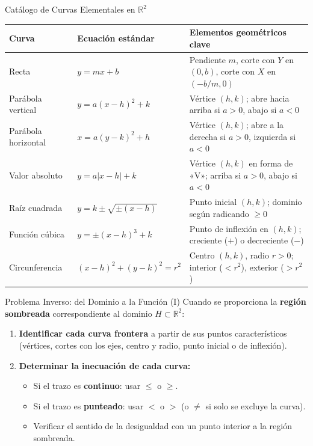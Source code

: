 \documentclass[aspectratio=169,10pt]{beamer}
\begin{document}
\begin{frame}{Catálogo de Curvas Elementales en $\mathbb{R}^2$}
  \begin{table}
    \centering
    \setlength{\tabcolsep}{3pt}
    \renewcommand{\arraystretch}{1.08}
    \footnotesize
    \begin{tabular}{p{3.0cm} p{3.8cm} p{6.2cm}}
      \toprule
      \textbf{Curva} & \textbf{Ecuación estándar} & \textbf{Elementos geométricos clave} \\
      \midrule
      Recta & $y = mx + b$ & Pendiente $m$, corte con $Y$ en $(0,b)$, corte con $X$ en $(-b/m, 0)$ \\
      Parábola vertical & $y = a(x-h)^2 + k$ & Vértice $(h,k)$; abre hacia arriba si $a>0$, abajo si $a<0$ \\
      Parábola horizontal & $x = a(y-k)^2 + h$ & Vértice $(h,k)$; abre a la derecha si $a>0$, izquierda si $a<0$ \\
      Valor absoluto & $y = a|x-h| + k$ & Vértice $(h,k)$ en forma de «V»; arriba si $a>0$, abajo si $a<0$ \\
      Raíz cuadrada & $y = k \pm \sqrt{\pm(x-h)}$ & Punto inicial $(h,k)$; dominio según radicando $\ge 0$ \\
      Función cúbica & $y = \pm(x-h)^3 + k$ & Punto de inflexión en $(h,k)$; creciente ($+$) o decreciente ($-$) \\
      Circunferencia & $(x-h)^2 + (y-k)^2 = r^2$ & Centro $(h,k)$, radio $r>0$; interior ($<r^2$), exterior ($>r^2$) \\
      \bottomrule
    \end{tabular}
  \end{table}
  \vfill
\end{frame}

\begin{frame}{Problema Inverso: del Dominio a la Función (I)}
  Cuando se proporciona la \textbf{región sombreada} correspondiente al dominio $H \subset \mathbb{R}^2$:

  \begin{enumerate}
    \item \textbf{Identificar cada curva frontera} a partir de sus puntos característicos
      (vértices, cortes con los ejes, centro y radio, punto inicial o de inflexión).
    \item \textbf{Determinar la inecuación de cada curva:}
      \begin{itemize}
        \item Si el trazo es \textbf{continuo}: usar $\le$ o $\ge$.
        \item Si el trazo es \textbf{punteado}: usar $<$ o $>$ (o $\neq$ si solo se excluye la curva).
        \item Verificar el sentido de la desigualdad con un punto interior a la región sombreada.
      \end{itemize}
  \end{enumerate}
  \vfill
\end{frame}
\end{document}
